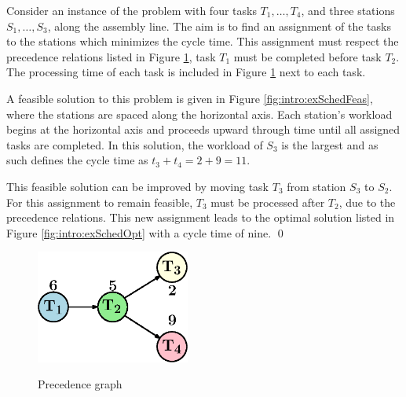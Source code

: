 \begin{example}\label{ex:intro:simple}
	Consider an instance of the problem with four tasks $T_1,\ldots,T_4$,
	and three stations $S_1,\ldots,S_3$,
	along the assembly line.
	The aim is to find an assignment of the tasks to the stations
	which minimizes the cycle time.
	This assignment must respect the precedence relations listed in Figure \ref{fig:intro:exPrec}, 
	\eg task $T_1$ must be completed before task $T_2$.
	The processing time of each task is included in Figure \ref{fig:intro:exPrec}
	next to each task.

	A feasible solution to this problem is given in Figure \ref{fig:intro:exSchedFeas},
	where the stations are spaced along the horizontal axis.
	Each station's workload begins at the horizontal axis and proceeds
	upward through time until all assigned tasks are completed.
	In this solution, the workload of $S_3$ is the largest
	and as such defines the cycle time as $t_3+t_4=2+9=11$.

	This feasible solution can be improved by moving task $T_3$ from station
	$S_3$ to $S_2$.
	For this assignment to remain feasible, $T_3$ must be processed
	after $T_2$, due to the precedence relations.
	This new assignment leads to the optimal solution listed in
	Figure \ref{fig:intro:exSchedOpt} with a cycle time of nine.	\qed
\end{example}

\begin{figure}[tpb]
	\centering
	\caption{Precedence graph}
	\vspace{2mm}
	\includegraphics[width=0.45\textwidth]{images/precgraphSimple.eps}
	\label{fig:intro:exPrec}
\end{figure}

